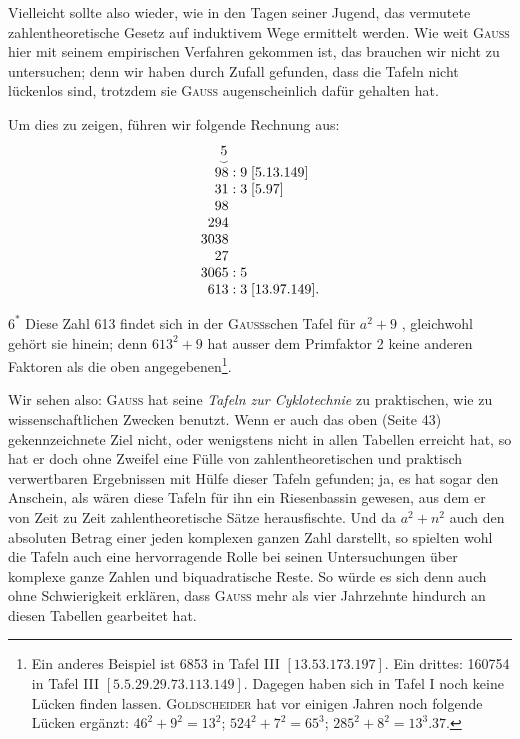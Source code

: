 Vielleicht sollte also wieder, wie in den Tagen seiner Jugend, das vermutete zahlentheoretische Gesetz auf induktivem Wege ermittelt werden. Wie
weit \textsc{Gauss} hier mit seinem empirischen Verfahren gekommen ist, das brauchen
wir nicht zu untersuchen; denn wir haben durch Zufall gefunden, dass die
Tafeln nicht lückenlos sind, trotzdem sie \textsc{Gauss} augenscheinlich dafür gehalten hat.

Um dies zu zeigen, führen wir folgende Rechnung aus:
\[
\begin{array}{r@{\;}l}
\MCurve{5}\hphantom{{}:9}&\\
98:9&[5\mathord{.}13\mathord{.}149]\\
31:3&[5\mathord{.}97]\\
98\hphantom{{}:3}&\\
294\hphantom{{}:3}&\\
3038\hphantom{{}:3}&\\
27\hphantom{{}:3}&\\
3065:5&\\
613:3&[13\mathord{.}97\mathord{.}149].
\end{array}
\]
\par\hfill $6^{\ast}$
\clearpage{}
\setcounter{footnote}{0}
\noindent Diese Zahl 613 findet sich in der \textsc{Gauss}schen Tafel für $a^2+9$ , gleichwohl gehört sie hinein; denn $613^2+9$ hat ausser dem Primfaktor 2 keine
anderen Faktoren als die oben angegebenen\footnote{Ein anderes Beispiel ist 6853 in Tafel III $[13\mathord{.}53\mathord{.}173\mathord{.}197]$. Ein drittes: 160754 in Tafel III
$[5\mathord{.}5\mathord{.}29\mathord{.}29\mathord{.}73\mathord{.}113\mathord{.}149]$. Dagegen haben sich in Tafel I noch keine Lücken finden lassen. \textsc{Goldscheider} hat vor einigen Jahren noch folgende Lücken ergänzt: $46^2+9^2=13^2$; $524^2+7^2=65^3$;
$285^2+8^2=13^3\mathord{.}37$.}.

Wir sehen also: \textsc{Gauss} hat seine \textit{Tafeln zur Cyklotechnie} zu praktischen,
wie zu wissenschaftlichen Zwecken benutzt. Wenn er auch das oben
(Seite 43) gekennzeichnete Ziel nicht, oder wenigstens nicht in allen Tabellen erreicht hat, so hat er doch ohne Zweifel eine Fülle von zahlentheoretischen und praktisch verwertbaren Ergebnissen mit Hülfe dieser Tafeln
gefunden; ja, es hat sogar den Anschein, als wären diese Tafeln für ihn ein
Riesenbassin gewesen, aus dem er von Zeit zu Zeit zahlentheoretische Sätze herausfischte. Und da $a^2+n^2$ auch den absoluten Betrag einer jeden komplexen
ganzen Zahl darstellt, so spielten wohl die Tafeln auch eine hervorragende
Rolle bei seinen Untersuchungen über komplexe ganze Zahlen und biquadratische Reste. So würde es sich denn auch ohne Schwierigkeit erklären, dass
\textsc{Gauss} mehr als vier Jahrzehnte hindurch an diesen Tabellen gearbeitet hat.

